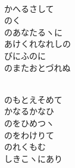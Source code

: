 \documentclass[10pt,b5j]{tarticle} %
\begin{document}
\vspace{1.5em} %
\newcommand{\linespace}{0.5em} %
\newcommand{\blocksize}{0.5\hsize} %
\newcommand{\itemmargin}{3em} %
\begin{enumerate} %
    \setlength{\itemindent}{\itemmargin} %
    \begin{minipage}[c]{\blocksize}
    
        \vspace{\linespace}
        \item~\\
        かへるさして\\
        のく\\
        のあなたるヽに\\
        あけくれなれしの\\
        びにふのに\\
        のまたおとづれぬ
        
    \end{minipage}
    \begin{minipage}[c]{\blocksize}
        
        \vspace{\linespace}
        \item~\\
        のもとえそめて\\
        かなるかなひ\\
        のをひめつヽ\\
        のをわけりて\\
        のれくもむ\\
        しきこヽにあり
    
    \end{minipage}
\end{enumerate} %
\end{document}
